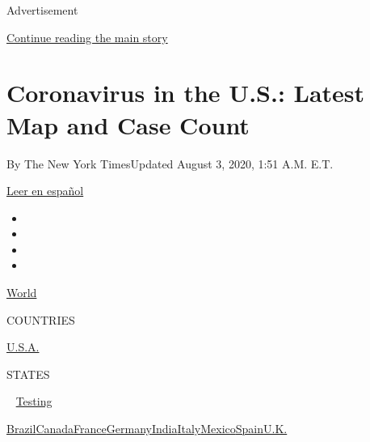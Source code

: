 Advertisement

\protect\hyperlink{after-top}{Continue reading the main story}

\hypertarget{coronavirus-in-the-us-latest-map-and-case-count}{%
\section{Coronavirus in the U.S.: Latest Map and Case
Count}\label{coronavirus-in-the-us-latest-map-and-case-count}}

By The New York TimesUpdated August 3, 2020, 1:51 A.M. E.T.

\href{https://www.nytimes.com/es/interactive/2020/espanol/mundo/coronavirus-en-estados-unidos.html}{Leer
en español}

\begin{itemize}
\item
\item
\item
\item
\end{itemize}

\href{https://www.nytimes.com/interactive/2020/world/coronavirus-maps.html}{World}~

COUNTRIES

\textbar{}
\href{https://www.nytimes.com/interactive/2020/us/coronavirus-us-cases.html}{U.S.A.}~

STATES

~
\href{https://www.nytimes.com/interactive/2020/us/coronavirus-testing.html}{Testing}

\href{https://www.nytimes.com/interactive/2020/world/americas/brazil-coronavirus-cases.html}{Brazil}\href{https://www.nytimes.com/interactive/2020/world/canada/canada-coronavirus-cases.html}{Canada}\href{https://www.nytimes.com/interactive/2020/world/europe/france-coronavirus-cases.html}{France}\href{https://www.nytimes.com/interactive/2020/world/europe/germany-coronavirus-cases.html}{Germany}\href{https://www.nytimes.com/interactive/2020/world/asia/india-coronavirus-cases.html}{India}\href{https://www.nytimes.com/interactive/2020/world/europe/italy-coronavirus-cases.html}{Italy}\href{https://www.nytimes.com/interactive/2020/world/americas/mexico-coronavirus-cases.html}{Mexico}\href{https://www.nytimes.com/interactive/2020/world/europe/spain-coronavirus-cases.html}{Spain}\href{https://www.nytimes.com/interactive/2020/world/europe/united-kingdom-coronavirus-cases.html}{U.K.}

